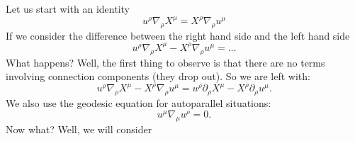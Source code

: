 Let us start with an identity
\begin{equation}\label{eq:lec14:id}
u^{\rho}\nabla_{\rho}X^{\mu}=X^{\rho}\nabla_{\rho}u^{\mu}
\end{equation}
If we consider the difference between the right hand side and the
left hand side
\begin{equation}
u^{\rho}\nabla_{\rho}X^{\mu}-X^{\rho}\nabla_{\rho}u^{\mu}=\dots
\end{equation}
What happens? Well, the first thing to observe is that there are
no terms involving connection components (they drop out). So we
are left with:
\begin{equation}
u^{\rho}\nabla_{\rho}X^{\mu}-X^{\rho}\nabla_{\rho}u^{\mu}=
u^{\rho}\partial_{\rho}X^{\mu}-X^{\rho}\partial_{\rho}u^{\mu}.
\end{equation}
We also use the geodesic equation for autoparallel situations:
\begin{equation}
u^{\mu}\nabla_{\mu}u^{\rho}=0.
\end{equation}
Now what? Well, we will consider
